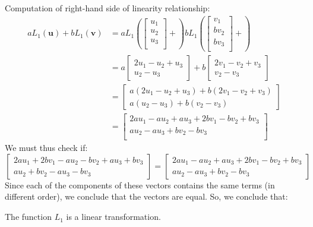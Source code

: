 \documentclass[12pt]{article}
\begin{document}
Computation of right-hand side of linearity relationship:
\begin{align*}
aL_1(\mathbf{u})+bL_1(\mathbf{v})&=
aL_1\left(\begin{bmatrix} u_1\\ u_2\\ u_3\\ \end{bmatrix}+
\right)
bL_1\left(\begin{bmatrix} v_1\\ bv_2\\ bv_3\\ \end{bmatrix}+
\right)\\
&=
a\begin{bmatrix}2u_1-u_2+u_3\\u_2-u_3\end{bmatrix}+
b\begin{bmatrix}2v_1-v_2+v_3\\v_2-v_3\end{bmatrix}
\\
&=
\begin{bmatrix} 
a(2u_1-u_2+u_3)+b(2v_1-v_2+v_3)\\
a(u_2-u_3)+b(v_2-v_3)
\end{bmatrix}\\
&=\begin{bmatrix}
2au_1-au_2+au_3+2bv_1-bv_2+bv_3\\
au_2-au_3+bv_2-bv_3\\
\end{bmatrix}
\end{align*}
We must thus check if:
\[
\begin{bmatrix}
2au_1+2bv_1-au_2-bv_2+au_3+bv_3\\
au_2+bv_2 - au_3-bv_3
\end{bmatrix}
=
\begin{bmatrix}
2au_1-au_2+au_3+2bv_1-bv_2+bv_3\\
au_2-au_3+bv_2-bv_3
\end{bmatrix}
\]
Since each of the components of these vectors contains the same terms (in different order), we conclude that the vectors are equal. So, we conclude that:
\begin{center}
The function $L_1$ is a linear transformation.
\end{center}
\proofend
\end{document}
